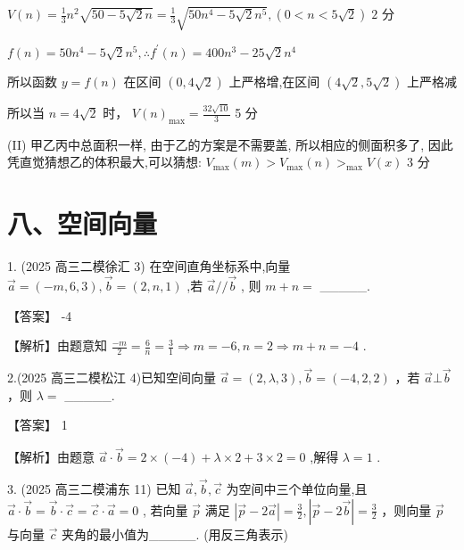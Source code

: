 \documentclass[10pt]{article}
\begin{document}
\(V\left( n\right)  = \frac{1}{3}{n}^{2}\sqrt{{50} - 5\sqrt{2}n} = \frac{1}{3}\sqrt{{50}{n}^{4} - 5\sqrt{2}{n}^{5}},\left( {0 < n < 5\sqrt{2}}\right) \;2\) 分

\(f\left( n\right)  = {50}{n}^{4} - 5\sqrt{2}{n}^{5},\therefore {f}^{\prime }\left( n\right)  = {400}{n}^{3} - {25}\sqrt{2}{n}^{4}\)

所以函数 \(y = f\left( n\right)\) 在区间 \(\left( {0,4\sqrt{2}}\right)\) 上严格增,在区间 \(\left( {4\sqrt{2},5\sqrt{2}}\right)\) 上严格减

所以当 \(n = 4\sqrt{2}\) 时， \(V{\left( n\right) }_{\max } = \frac{{32}\sqrt{10}}{3}\) 5 分

(II) 甲乙丙中总面积一样, 由于乙的方案是不需要盖, 所以相应的侧面积多了, 因此凭直觉猜想乙的体积最大,可以猜想: \({V}_{\max }\left( m\right)  > {V}_{\max }\left( n\right) { > }_{\max }V\left( x\right)\) 3 分

\section*{八、空间向量}

1. (2025 高三二模徐汇 3) 在空间直角坐标系中,向量 \(\overrightarrow{a} = \left( {-m,6,3}\right) ,\overrightarrow{b} = \left( {2,n,1}\right)\) ,若 \(\overrightarrow{a}//\overrightarrow{b}\) , 则 \(m + n =\) \_\_\_\_\_.

【答案】 -4

【解析】由题意知 \(\frac{-m}{2} = \frac{6}{n} = \frac{3}{1} \Rightarrow  m =  - 6,n = 2 \Rightarrow  m + n =  - 4\) .

2.(2025 高三二模松江 4)已知空间向量 \(\overrightarrow{a} = \left( {2,\lambda ,3}\right) ,\overrightarrow{b} = \left( {-4,2,2}\right)\) ，若 \(\overrightarrow{a}\bot \overrightarrow{b}\) ，则 \(\lambda  =\) \_\_\_\_\_.

【答案】 1

【解析】由题意 \(\overrightarrow{a} \cdot  \overrightarrow{b} = 2 \times  \left( {-4}\right)  + \lambda  \times  2 + 3 \times  2 = 0\) ,解得 \(\lambda  = 1\) .

3. (2025 高三二模浦东 11) 已知 \(\overrightarrow{a},\overrightarrow{b},\overrightarrow{c}\) 为空间中三个单位向量,且 \(\overrightarrow{a} \cdot  \overrightarrow{b} = \overrightarrow{b} \cdot  \overrightarrow{c} = \overrightarrow{c} \cdot  \overrightarrow{a} = 0\) , 若向量 \(\overrightarrow{p}\) 满足 \(\left| {\overrightarrow{p} - 2\overrightarrow{a}}\right|  = \frac{3}{2},\left| {\overrightarrow{p} - 2\overrightarrow{b}}\right|  = \frac{3}{2}\) ，则向量 \(\overrightarrow{p}\) 与向量 \(\overrightarrow{c}\) 夹角的最小值为\_\_\_\_\_. (用反三角表示)
\end{document}
